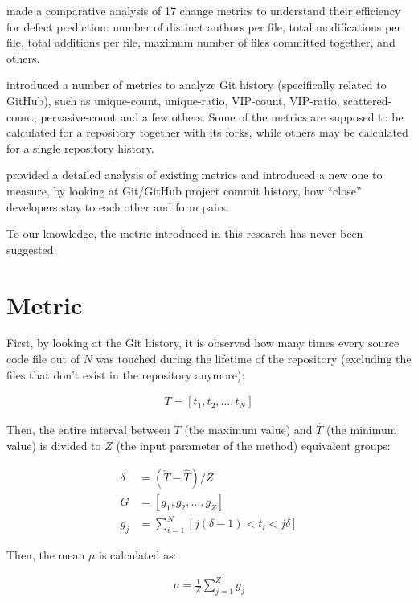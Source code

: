 \documentclass[sigconf]{acmart}
\begin{document}
\citet{moser2008} made a comparative analysis of 17 change metrics to understand
their efficiency for defect prediction: number of distinct authors per file,
total modifications per file, total additions per file, maximum number of
files committed together, and others.

\citet{biazzini2014} introduced a number of metrics to analyze
Git history (specifically related to GitHub), such as unique-count, unique-ratio,
VIP-count, VIP-ratio, scattered-count, pervasive-count and a few others. Some
of the metrics are supposed to be calculated for a repository together with
its forks, while others may be calculated for a single repository history.

\citet{batista2018} provided a detailed analysis of existing metrics
and introduced a new one to measure, by looking at Git/GitHub project
commit history, how ``close'' developers stay to each other and form
pairs.

To our knowledge, the metric introduced in this research has never been
suggested.

\section{Metric}
\label{sec:method}

First, by looking at the Git history,
it is observed how many times every source code file out of $N$ was touched
during the lifetime of the repository (excluding the files that don't exist
in the repository anymore):

\begin{eqnarray}
T = [t_1, t_2, \dots, t_N]
\end{eqnarray}

Then, the entire interval between $\check{T}$ (the maximum value)
and $\hat{T}$ (the minimum value) is divided to $Z$ (the input parameter of the method)
equivalent groups:

\begin{align}
\delta &= ( \check{T} - \hat{T} ) / Z \\
G &= [g_1, g_2, \dots, g_{Z}] \\
g_j &= \sum_{i=1}^N [ j(\delta-1) < t_i < j\delta ]
\end{align}

Then, the mean $\mu$ is calculated as:

\begin{eqnarray}
\mu = \frac{1}{Z}\sum_{j=1}^{Z}{g_j}
\end{eqnarray}
\end{document}
